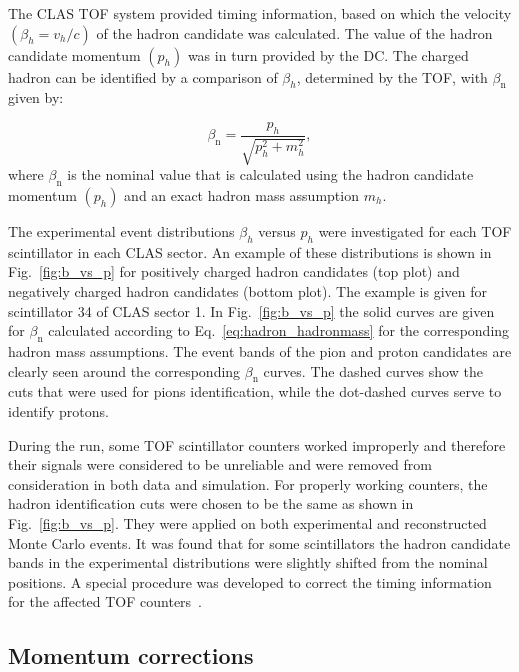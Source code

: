 \documentclass[prc,twocolumn,superscriptaddress,showpacs,amssymb,amsmath,amsfonts,aps,nofootinbib]{revtex4-1}
\begin{document}
The CLAS TOF system provided timing information, based on which  the velocity $(\beta_{h} = v_{h}/c)$ of the hadron candidate was calculated.  
The value of the hadron candidate momentum $(p_{h})$
was in turn provided by the DC.  The
charged hadron can be identified by a comparison of $\beta_{h}$, determined by the TOF, with $\beta_{\text{n}}$ given by:

\begin{equation}
\beta_{\text{n}}=\frac{p_{h}}{\sqrt{p_{h}^{2}+m_{h}^{2}}},
\label{eq:hadron_hadronmass}
\end{equation}
where $\beta_{\text{n}}$ is the nominal value that is calculated using the hadron candidate momentum $(p_{h})$ and an exact hadron mass assumption $m_{h}$. 






The experimental event distributions $\beta_{h}$ versus $p_{h}$ were investigated for each TOF scintillator in each CLAS sector. An example of these distributions is shown in Fig.~\ref{fig:b_vs_p} for positively charged hadron candidates (top plot) and negatively charged hadron candidates (bottom plot). 
 The example is given for scintillator 34 of CLAS sector 1. In Fig.~\ref{fig:b_vs_p} the solid curves are given for $\beta_{\text{n}}$ calculated according to Eq.~\eqref{eq:hadron_hadronmass} for the corresponding hadron mass assumptions. 
The event bands of the pion and proton candidates are clearly seen around the corresponding $\beta_{\text{n}}$ curves.  
The dashed curves show the cuts that were used for pions identification, while the dot-dashed curves serve to identify protons. 

During the run, some TOF scintillator counters worked improperly and therefore their signals were considered to be unreliable and were removed from consideration in both data and simulation. 
For properly working counters, the hadron identification cuts were chosen to be the same as shown in Fig.~\ref{fig:b_vs_p}. They were applied on both experimental and reconstructed Monte Carlo events. It was found that for some scintillators  the hadron candidate bands in the experimental distributions were slightly shifted from the nominal positions. A special procedure was developed  to correct the timing information for the affected TOF counters~\cite{Fed_an_note:2017}.




\subsection{Momentum corrections}
\end{document}
